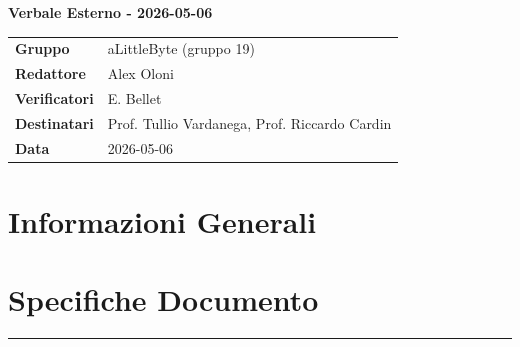 \documentclass[a4paper,12pt]{article}
\begin{document}
\thispagestyle{firstpage}

\vspace*{0.5cm}

\begin{center}
    {\LARGE \textbf{Verbale Esterno - 2026-05-06}}
\end{center}

\vspace{1.5cm}

\begin{center}
    \renewcommand{\arraystretch}{1.3}
    \begin{tcolorbox}[
        width=0.92\textwidth,
        colback=gray!6,
        colframe=gray!45,
        boxrule=0.5pt,
        arc=2mm,
        boxsep=0pt,
        left=8pt, right=8pt, top=8pt, bottom=8pt
    ]
        \begin{tabularx}{\linewidth}{>{\bfseries}p{3.5cm} X}
            Gruppo      & aLittleByte (gruppo 19) \\
            Redattore   & Alex Oloni \\
            Verificatori& E. Bellet\\
            Destinatari & Prof. Tullio Vardanega, Prof. Riccardo Cardin \\
            Data        & 2026-05-06\\
        \end{tabularx}
    \end{tcolorbox}
\end{center}

\newpage

\tableofcontents
\newpage

\section{Informazioni Generali}
\section*{Specifiche Documento}
\hrule
\vspace{1cm}
\end{document}
